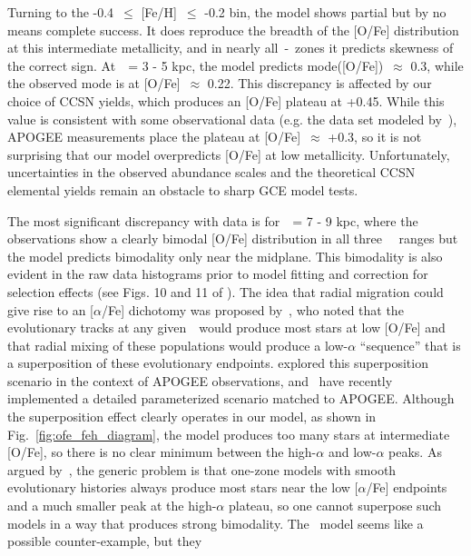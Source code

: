 \documentclass[draft2.tex]{subfiles}
\begin{document}
\par 
Turning to the -0.4~$\leq$ [Fe/H]~$\leq$ -0.2 bin, the model shows partial but 
by no means complete success. 
It does reproduce the breadth of the [O/Fe] distribution at this intermediate 
metallicity, and in nearly all~\rgal-\absz~zones it predicts skewness of the 
correct sign. 
At~\rgal~= 3 - 5 kpc, the model predicts mode([O/Fe])~$\approx$ 0.3, while 
the observed mode is at [O/Fe]~$\approx$ 0.22. 
This discrepancy is affected by our choice of CCSN yields, which produces an 
[O/Fe] plateau at +0.45. 
While this value is consistent with some observational data (e.g. the 
\citealp*{Ramirez2013} data set modeled by~\citealp{Andrews2017}), APOGEE 
measurements place the plateau at [O/Fe]~$\approx$ +0.3, so it is not 
surprising that our model overpredicts [O/Fe] at low metallicity. 
Unfortunately, uncertainties in the observed abundance scales and the 
theoretical CCSN elemental yields remain an obstacle to sharp GCE model tests. 
\par 
The most significant discrepancy with data is for~\rgal~= 7 - 9 kpc, where the 
observations show a clearly bimodal [O/Fe] distribution in all three~\absz~ 
ranges but the model predicts bimodality only near the midplane. 
This bimodality is also evident in the raw data histograms prior to model 
fitting and correction for selection effects (see Figs. 10 and 11 of 
\citealp{Vincenzo2021a}). 
The idea that radial migration could give rise to an [$\alpha$/Fe] dichotomy 
was proposed by~\citet{Schoenrich2009a}, who noted that the evolutionary tracks 
at any given~\rgal~would produce most stars at low [O/Fe] and that radial 
mixing of these populations would produce a low-$\alpha$ ``sequence'' that is 
a superposition of these evolutionary endpoints. 
\citet{Nidever2014} explored this superposition scenario in the context of 
APOGEE observations, and~\citet{Sharma2020} have recently implemented a 
detailed parameterized scenario matched to APOGEE. 
Although the superposition effect clearly operates in our model, as shown in 
Fig.~\ref{fig:ofe_feh_diagram}, the model produces too many stars at 
intermediate [O/Fe], so there is no clear minimum between the high-$\alpha$ 
and low-$\alpha$ peaks. 
As argued by~\citet{Vincenzo2021a}, the generic problem is that one-zone models 
with smooth evolutionary histories always produce most stars near the low 
[$\alpha$/Fe] endpoints and a much smaller peak at the high-$\alpha$ 
plateau, so one cannot superpose such models in a way that produces strong 
bimodality. 
The~\citet{Sharma2020} model seems like a possible counter-example, but they 
\end{document}
